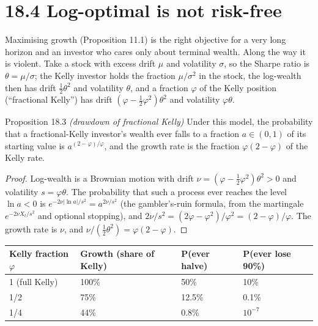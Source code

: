 \documentclass[11pt,a4paper,openany]{book}
\newcommand{\abs}[1]{\lvert #1\rvert}
\begin{document}
\section*{18.4 Log-optimal is not risk-free}\label{ch18-risk}

Maximising growth (Proposition 11.1) is the right objective for a very long horizon and an investor who cares only about terminal wealth. Along the way it is violent. Take a stock with excess drift $\mu$ and volatility $\sigma$, so the Sharpe ratio is $\theta=\mu/\sigma$; the Kelly investor holds the fraction $\mu/\sigma^2$ in the stock, the log-wealth then has drift $\tfrac12\theta^2$ and volatility $\theta$, and a fraction $\varphi$ of the Kelly position (``fractional Kelly'') has drift $(\varphi-\tfrac12\varphi^2)\theta^2$ and volatility $\varphi\theta$.

\begin{bthm}{Proposition 18.3 \emph{(drawdown of fractional Kelly)}}
Under this model, the probability that a fractional-Kelly investor's wealth ever falls to a fraction $a\in(0,1)$ of its starting value is $a^{(2-\varphi)/\varphi}$, and the growth rate is the fraction $\varphi(2-\varphi)$ of the Kelly rate.
\end{bthm}

\begin{proof}
Log-wealth is a Brownian motion with drift $\nu=(\varphi-\tfrac12\varphi^2)\theta^2>0$ and volatility $s=\varphi\theta$. The probability that such a process ever reaches the level $\ln a<0$ is $e^{-2\nu\abs{\ln a}/s^2}=a^{2\nu/s^2}$ (the gambler's-ruin formula, from the martingale $e^{-2\nu X_t/s^2}$ and optional stopping), and $2\nu/s^2=(2\varphi-\varphi^2)/\varphi^2=(2-\varphi)/\varphi$. The growth rate is $\nu$, and $\nu/(\tfrac12\theta^2)=\varphi(2-\varphi)$.
\end{proof}

\begin{center}\small
\begin{tabularx}{\linewidth}{YYll}
\toprule
\textbf{Kelly fraction $\varphi$} & \textbf{Growth (share of Kelly)} & \textbf{P(ever halve)} & \textbf{P(ever lose 90\%)} \\
 (full Kelly) & 100\% & 50\% & 10\% \\
1/2 & 75\% & 12.5\% & 0.1\% \\
1/4 & 44\% & 0.8\% & $10^{-7}$ \\
\bottomrule
\end{tabularx}
\end{center}
\end{document}
